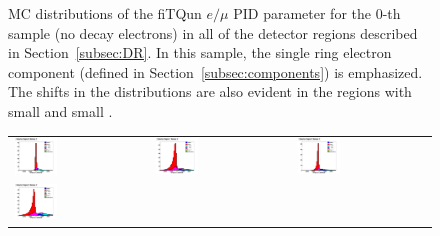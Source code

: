 \begin{figure}[h!]
\begin{tabular}{l  l  l}
\end{tabular}
\caption{MC distributions of the fiTQun $e/\mu$ PID parameter for the $0$-th
sample (no decay electrons) in all of the detector regions described in
Section~\ref{subsec:DR}.  In this sample, the single ring electron component
(defined in Section~\ref{subsec:components}) is emphasized. The shifts in the
distributions are also evident in the regions with small \wall and small
\towall.}
\end{figure}

\begin{figure}[h!]
\label{fig:samplot1}
\centering
\begin{tabular}{l  l  l}
  \includegraphics[width=0.33\textwidth]{plots/mc_breakdown_comp_1_bin_0_att_0} 
  &\includegraphics[width=0.33\textwidth]{plots/mc_breakdown_comp_1_bin_1_att_0}  
  &\includegraphics[width=0.33\textwidth]{plots/mc_breakdown_comp_1_bin_2_att_0} \\
  \includegraphics[width=0.33\textwidth]{plots/mc_breakdown_comp_1_bin_3_att_0} 

\end{tabular}
\end{figure}
